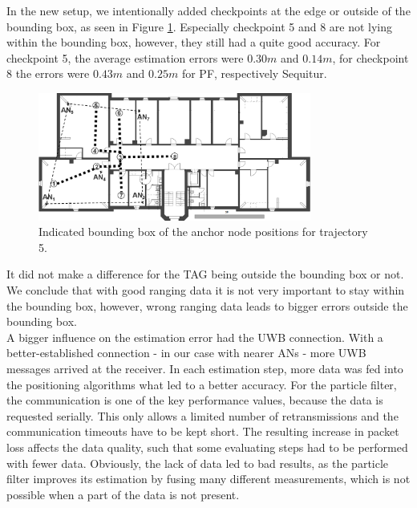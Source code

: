 In the new setup, we intentionally added checkpoints at the edge or outside of the bounding box, as seen in Figure \ref{fig:trajectory5_boundingBox}. Especially checkpoint 5 and 8 are not lying within the bounding box, however, they still had a quite good accuracy. For checkpoint 5, the average estimation errors were $0.30m$ and $0.14m$, for checkpoint 8 the errors were $0.43m$ and $0.25m$ for PF, respectively Sequitur.
\begin{figure}[th]
\centering
\includegraphics[width=0.8\textwidth]{Figures/trajectory5_boundingBox}
\decoRule
\caption[Trajectory 5 with Bounding Box]{Indicated bounding box of the anchor node positions for trajectory 5.}
\label{fig:trajectory5_boundingBox}
\end{figure}
It did not make a difference for the TAG being outside the bounding box or not. We conclude that with good ranging data it is not very important to stay within the bounding box, however, wrong ranging data leads to bigger errors outside the bounding box.\\
\noindent\hspace*{5mm}%
A bigger influence on the estimation error had the UWB connection. With a better-established connection - in our case with nearer ANs - more UWB messages arrived at the receiver. In each estimation step, more data was fed into the positioning algorithms what led to a better accuracy. For the particle filter, the communication is one of the key performance values, because the data is requested serially. This only allows a limited number of retransmissions and the communication timeouts have to be kept short. The resulting increase in packet loss affects the data quality, such that some evaluating steps had to be performed with fewer data. Obviously, the lack of data led to bad results, as the particle filter improves its estimation by fusing many different measurements, which is not possible when a part of the data is not present.